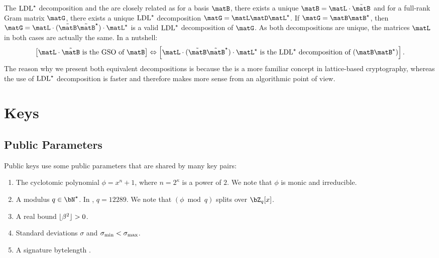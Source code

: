 The $ \text{LDL}^\star $ decomposition and the \gso are closely related as for a basis $\matB$, there exists a unique \gso $\matB = \L \cdot \tBB$ and for a full-rank Gram matrix $\matG$, there exists a unique $ \text{LDL}^\star $ decomposition $\matG = \L  \matD  \adj\L$. If $\matG = \matB \adj \matB$, then $\matG = \L \cdot (\tBB \adj \tBB) \cdot \adj\L$ is a valid $ \text{LDL}^\star $ decomposition of $\matG$. As both decompositions are unique, the matrices $\L$ in both cases are actually the same. In a nutshell:
\begin{equation}
 \left[\L\cdot\tBB \text{ is the \gso of } \matB \right]
  \Leftrightarrow  \left[ \L \cdot (\tBB\adj \tBB) \cdot \adj\L  \text{ is the $\LDLs$ decomposition of }(\matB\adj \matB)\right].
\end{equation}
The reason why we present both equivalent decompositions is because the \gso is a more familiar concept in lattice-based cryptography, whereas the use of $ \text{LDL}^\star $ decomposition is faster and therefore makes more sense from an algorithmic point of view.

\section{Keys} \label{sec:spec:keys}

\subsection{Public Parameters}

Public keys use some public parameters that are shared by many key
pairs:
\begin{enumerate}
\item The cyclotomic polynomial $\phi = x^n+1$, where $n = 2^\kappa$ is a power of $2$. We note that $\phi$ is monic and irreducible.
\item A modulus $q \in \bN^\star$. In \falcon, $q = 12289$. We note that $(\phi \bmod q)$ splits over $\bZ_q[x]$.
\item A real bound $\lfloor \beta^2 \rfloor > 0$.
\item Standard deviations $\sigma$ and $\sigma_{\min} < \sigma_{\max}$.
\item A signature bytelength \sigbytelen.
\end{enumerate}

